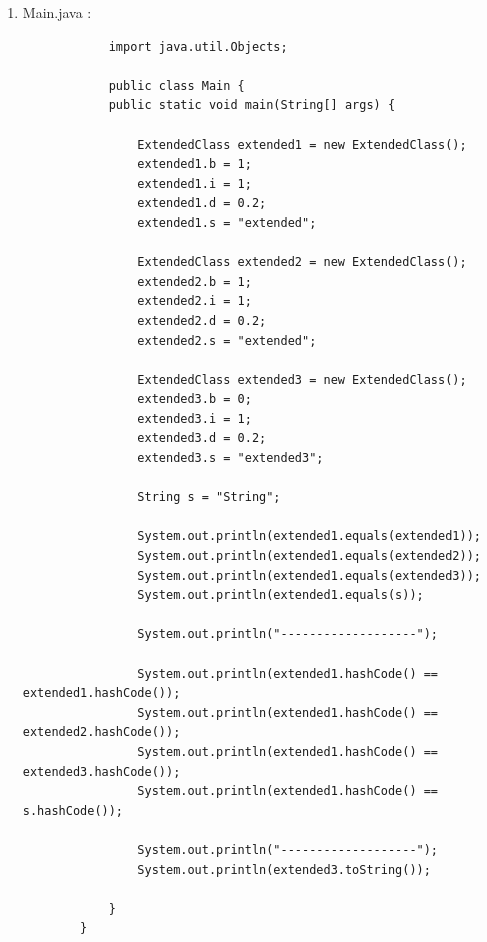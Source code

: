 \documentclass[a4paper]{article}
\begin{document}
\begin{enumerate}
\begin{lstlisting}
                @Override
                public String toString() {

                    return "byte: "+ b + "\n" + "int: " +"i "+ "\n" + "double: " + d + "\n" + "String: " + s ;
                }
            }
        \end{lstlisting}

        \item Main.java :
        
        \begin{lstlisting}
            import java.util.Objects;

            public class Main {
            public static void main(String[] args) {

                ExtendedClass extended1 = new ExtendedClass();
                extended1.b = 1;
                extended1.i = 1;
                extended1.d = 0.2;
                extended1.s = "extended";

                ExtendedClass extended2 = new ExtendedClass();
                extended2.b = 1;
                extended2.i = 1;
                extended2.d = 0.2;
                extended2.s = "extended";

                ExtendedClass extended3 = new ExtendedClass();
                extended3.b = 0;
                extended3.i = 1;
                extended3.d = 0.2;
                extended3.s = "extended3";

                String s = "String";

                System.out.println(extended1.equals(extended1));
                System.out.println(extended1.equals(extended2));
                System.out.println(extended1.equals(extended3));
                System.out.println(extended1.equals(s));

                System.out.println("-------------------");

                System.out.println(extended1.hashCode() == extended1.hashCode());
                System.out.println(extended1.hashCode() == extended2.hashCode());
                System.out.println(extended1.hashCode() == extended3.hashCode());
                System.out.println(extended1.hashCode() == s.hashCode());

                System.out.println("-------------------");
                System.out.println(extended3.toString());
                
            }
        }
        \end{lstlisting}


\end{enumerate}
\end{document}
